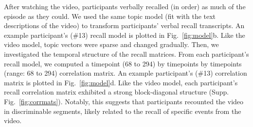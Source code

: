 \documentclass{article}
\begin{document}
{After watching the video, participants verbally recalled (in order) as much of the episode as they could.  We used the same topic model (fit with the text descriptions of the video) to transform participants' verbal recall transcripts. An example participant's (\#13) recall model is plotted in Fig.~\ref{fig:model}b. Like the video model, topic vectors were sparse and changed gradually.  Then, we investigated the temporal structure of the recall matrices. From each participant's recall model, we computed a timepoint (68 to 294) by timepoints by timepoints (range: 68 to 294) correlation matrix. An example participant's (\#13) correlation matrix is plotted in Fig.~\ref{fig:model}d. Like the video model, each participant's recall correlation matrix exhibited a strong block-diagonal structure (Supp. Fig.~\ref{fig:corrmats}). Notably, this suggests that participants recounted the video in discriminable segments, likely related to the recall of specific events from the video.


}
\end{document}
